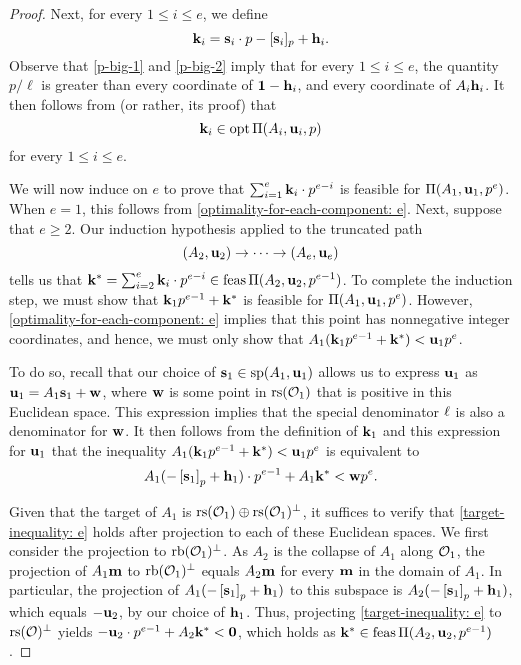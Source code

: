 \documentclass[11pt]{amsart}
\begin{document}
\begin{proof}
Next, for every $1 \leq i \leq e$,  we define
  \[
\mathbf{k}_i = \mathbf{s}_i \cdot p - [\mathbf{s}_i]_p + \mathbf{h}_i.
\]
Observe that \eqref{p-big-1} and \eqref{p-big-2} imply that for every $1 \leq i \leq e$, the quantity $p/\ell$ is greater than every coordinate of $\mathbf{1}-\mathbf{h}_i$, and every coordinate of $A_i \mathbf{h}_i$.  It then follows from  (or rather, its proof) that 
\begin{equation}
\label{optimality-for-each-component: e}
\mathbf{k}_i \in \operatorname{opt} \Pi(A_i, \mathbf{u}_i,p)
\end{equation}
for every $1 \leq i \leq e$.

We will now induce on $e$ to prove that $\sum_{i=1}^e \mathbf{k}_i \cdot p^{e-i}$ is feasible for $\Pi(A_1, \mathbf{u}_1, p^e)$.  When $e = 1$, this follows from \eqref{optimality-for-each-component: e}.  Next, suppose that $e \geq 2$.  Our induction hypothesis applied to the truncated path  
\[ (A_2, \mathbf{u}_2) \to \cdots \to (A_e, \mathbf{u}_e) \]
%
tells us that $\mathbf{k}^{\ast} = \sum_{i=2}^e \mathbf{k}_i \cdot p^{e-i} \in \operatorname{feas} \Pi(A_2, \mathbf{u}_2, p^{e-1})$.  To complete the induction step, we must show that $\mathbf{k}_1 p^{e-1} + \mathbf{k}^{\ast}$ is feasible for $\Pi(A_1, \mathbf{u}_1, p^e)$.  However,  \eqref{optimality-for-each-component: e} implies that this point has nonnegative integer coordinates, and hence, we must only show that $A_1 ( \mathbf{k}_1 p^{e-1} + \mathbf{k}^{\ast} ) < \mathbf{u}_1 p^e$.

To do so,  recall that our choice of $\mathbf{s}_1 \in \operatorname{sp}(A_1, \mathbf{u}_1)$ allows us to express $\mathbf{u}_1$ as 
$\mathbf{u}_1 = A_1 \mathbf{s}_1 + \mathbf{w}$, where $\mathbf{w}$ is some point in $\operatorname{rs}(\mathcal{O}_1)$ that is positive in this Euclidean space.  This expression implies that the special denominator $\ell$ is also a denominator for $\mathbf{w}$.  It then follows from the definition of $\mathbf{k}_1$ and this expression for $\mathbf{u}_1$ that the inequality $A_1 ( \mathbf{k}_1 p^{e-1} + \mathbf{k}^{\ast} ) < \mathbf{u}_1 p^e$ is equivalent to 
%
\begin{equation}
\label{target-inequality: e}
  A_1( - \left[ \mathbf{s}_1 \right]_p + \mathbf{h}_1 ) \cdot p^{e-1} + A_1\mathbf{k}^{\ast} < \mathbf{w} p^e.
\end{equation}

Given that the target of $A_1$ is $\operatorname{rs}(\mathcal{O}_1) \oplus \operatorname{rs}(\mathcal{O}_1)^{\perp}$, it suffices to verify that \eqref{target-inequality: e} holds after projection to each of these Euclidean spaces.  We first consider the projection to $\operatorname{rb}(\mathcal{O}_1)^{\perp}$.  As $A_2$ is the collapse of $A_1$ along $\mathcal{O}_1$, the projection of $A_1 \mathbf{m}$ to $\operatorname{rb}(\mathcal{O}_1)^{\perp}$ equals $A_2 \mathbf{m}$ for every $\mathbf{m}$ in the domain of $A_1$.  In particular, the projection of $A_1( - \left[ \mathbf{s}_1 \right]_p + \mathbf{h}_1 )$ to this subspace is $A_2 ( - \left[ \mathbf{s}_1 \right]_p + \mathbf{h}_1 )$, which equals $-\mathbf{u}_2$, by our choice of $\mathbf{h}_1$.  Thus, projecting \eqref{target-inequality: e} to $\operatorname{rs}(\mathcal{O})^{\perp}$ yields $-\mathbf{u}_2 \cdot p^{e-1} + A_2 \mathbf{k}^{\ast} < \mathbf{0}$, which holds as $\mathbf{k}^{\ast} \in \operatorname{feas} \Pi(A_2, \mathbf{u}_2, p^{e-1})$.


\end{proof}
\end{document}
